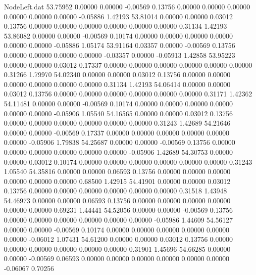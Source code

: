 \begin{filecontents}{NodeLeft.dat}
  53.75952    0.00000    0.00000    -0.00569    0.13756    0.00000    0.00000    0.00000    0.00000    0.00000    0.00000   -0.05886    1.42193
  53.81014    0.00000    0.00000     0.03012    0.13756    0.00000    0.00000    0.00000    0.00000    0.00000    0.00000    0.31134    1.42193
  53.86082    0.00000    0.00000    -0.00569    0.10174    0.00000    0.00000    0.00000    0.00000    0.00000    0.00000   -0.05886    1.05174
  53.91164    0.03357    0.00000    -0.00569    0.13756    0.00000    0.00000    0.00000    0.00000   -0.03357    0.00000   -0.05913    1.42858
  53.95223    0.00000    0.00000     0.03012    0.17337    0.00000    0.00000    0.00000    0.00000    0.00000    0.00000    0.31266    1.79970
  54.02340    0.00000    0.00000     0.03012    0.13756    0.00000    0.00000    0.00000    0.00000    0.00000    0.00000    0.31134    1.42193
  54.06414    0.00000    0.00000     0.03012    0.13756    0.00000    0.00000    0.00000    0.00000    0.00000    0.00000    0.31171    1.42362
  54.11481    0.00000    0.00000    -0.00569    0.10174    0.00000    0.00000    0.00000    0.00000    0.00000    0.00000   -0.05906    1.05540
  54.16565    0.00000    0.00000     0.03012    0.13756    0.00000    0.00000    0.00000    0.00000    0.00000    0.00000    0.31243    1.42689
  54.21646    0.00000    0.00000    -0.00569    0.17337    0.00000    0.00000    0.00000    0.00000    0.00000    0.00000   -0.05906    1.79838
  54.25687    0.00000    0.00000    -0.00569    0.13756    0.00000    0.00000    0.00000    0.00000    0.00000    0.00000   -0.05906    1.42689
  54.30753    0.00000    0.00000     0.03012    0.10174    0.00000    0.00000    0.00000    0.00000    0.00000    0.00000    0.31243    1.05540
  54.35816    0.00000    0.00000     0.06593    0.13756    0.00000    0.00000    0.00000    0.00000    0.00000    0.00000    0.68500    1.42915
  54.41901    0.00000    0.00000     0.03012    0.13756    0.00000    0.00000    0.00000    0.00000    0.00000    0.00000    0.31518    1.43948
  54.46973    0.00000    0.00000     0.06593    0.13756    0.00000    0.00000    0.00000    0.00000    0.00000    0.00000    0.69231    1.44441
  54.52056    0.00000    0.00000    -0.00569    0.13756    0.00000    0.00000    0.00000    0.00000    0.00000    0.00000   -0.05986    1.44609
  54.56127    0.00000    0.00000    -0.00569    0.10174    0.00000    0.00000    0.00000    0.00000    0.00000    0.00000   -0.06012    1.07431
  54.61200    0.00000    0.00000     0.03012    0.13756    0.00000    0.00000    0.00000    0.00000    0.00000    0.00000    0.31901    1.45696
  54.66285    0.00000    0.00000    -0.00569    0.06593    0.00000    0.00000    0.00000    0.00000    0.00000    0.00000   -0.06067    0.70256

\end{filecontents}
